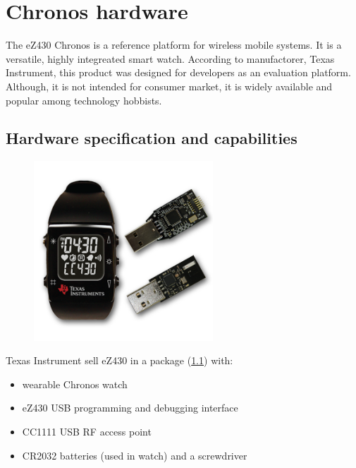 \chapter{Chronos hardware}

The eZ430 Chronos is a reference platform for wireless mobile systems.
It is a versatile, highly integreated smart watch.
According to manufactorer, Texas Instrument, this product was designed for developers as an evaluation platform.
Although, it is not intended for consumer market, it is widely available and popular among technology hobbists.

\section{Hardware specification and capabilities}

\begin{figure}[h!]
  \centering
  \includegraphics[width=0.6\textwidth]{img/chronos_watch.png}
  \caption{}
  \label{fig:eZ430_package}
\end{figure}

Texas Instrument sell eZ430 in a package (\ref{fig:eZ430_package}) with:
\begin{itemize}
  \item wearable Chronos watch
  \item eZ430 USB programming and debugging interface
  \item CC1111 USB RF access point
  \item CR2032 batteries (used in watch) and a screwdriver
\end{itemize}

